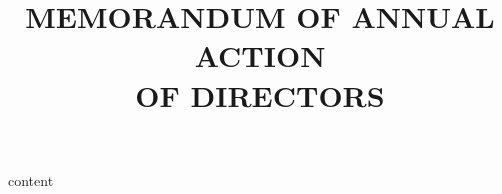\documentclass[12pt]{scrartcl}
\title{MEMORANDUM OF ANNUAL ACTION\\OF DIRECTORS}
\begin{document}
\maketitle
{content}
\end{document}
